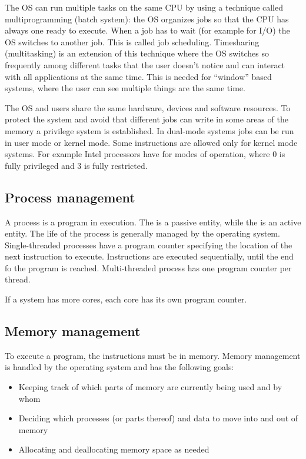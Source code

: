The OS can run multiple tasks on the same CPU by using a technique called multiprogramming (batch system): the OS organizes jobs so that the CPU has always one ready to execute. When a job has to wait (for example for I/O) the OS switches to another job. This is called job scheduling. Timesharing (multitasking) is an extension of this technique where the OS switches so frequently among different tasks that the user doesn't notice and can interact with all applications at the same time. This is needed for ``window'' based systems, where the user can see multiple things are the same time.


The OS and users share the same hardware, devices and software resources. To protect the system and avoid that different jobs can write in some areas of the memory a privilege system is established. In dual-mode systems jobs can be run in user mode or kernel mode. Some instructions are allowed only for kernel mode systems. For example Intel processors have for modes of operation, where 0 is fully privileged and 3 is fully restricted.

\subsection{Process management}

A process is a program in execution. The  is a passive entity, while the  is an active entity. The life of the process is generally managed by the operating system. Single-threaded processes have a program counter specifying the location of the next instruction to execute. Instructions are executed sequentially, until the end fo the program is reached. Multi-threaded process has one program counter per thread.

If a system has more cores, each core has its own program counter.

\subsection{Memory management}

To execute a program, the instructions must be in memory. Memory management is
handled by the operating system and has the following goals:
\begin{itemize}
  \item Keeping track of which parts of memory are currently being used and by
  whom
  \item Deciding which processes (or parts thereof) and data to move into and
  out of memory
  \item Allocating and deallocating memory space as needed
\end{itemize}

